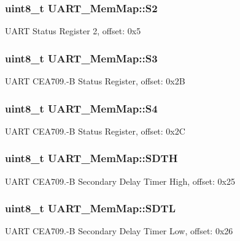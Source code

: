 \subsubsection[{S2}]{\setlength{\rightskip}{0pt plus 5cm}uint8\+\_\+t U\+A\+R\+T\+\_\+\+Mem\+Map\+::\+S2}\label{struct_u_a_r_t___mem_map_a6107c55f4dba727e1a4e70f76acd7b20}
U\+A\+R\+T Status Register 2, offset\+: 0x5 \hypertarget{struct_u_a_r_t___mem_map_a3aa12aba05d8d4c73c27c316a0f422cc}{}
\subsubsection[{S3}]{\setlength{\rightskip}{0pt plus 5cm}uint8\+\_\+t U\+A\+R\+T\+\_\+\+Mem\+Map\+::\+S3}\label{struct_u_a_r_t___mem_map_a3aa12aba05d8d4c73c27c316a0f422cc}
U\+A\+R\+T C\+E\+A709.-\/\+B Status Register, offset\+: 0x2\+B \hypertarget{struct_u_a_r_t___mem_map_a94722c3f3c663800fc6178ac9f24049b}{}
\subsubsection[{S4}]{\setlength{\rightskip}{0pt plus 5cm}uint8\+\_\+t U\+A\+R\+T\+\_\+\+Mem\+Map\+::\+S4}\label{struct_u_a_r_t___mem_map_a94722c3f3c663800fc6178ac9f24049b}
U\+A\+R\+T C\+E\+A709.-\/\+B Status Register, offset\+: 0x2\+C \hypertarget{struct_u_a_r_t___mem_map_ace3766dcf2abe24be7b96e83348bb07f}{}
\subsubsection[{S\+D\+T\+H}]{\setlength{\rightskip}{0pt plus 5cm}uint8\+\_\+t U\+A\+R\+T\+\_\+\+Mem\+Map\+::\+S\+D\+T\+H}\label{struct_u_a_r_t___mem_map_ace3766dcf2abe24be7b96e83348bb07f}
U\+A\+R\+T C\+E\+A709.-\/\+B Secondary Delay Timer High, offset\+: 0x25 \hypertarget{struct_u_a_r_t___mem_map_a3b5758c5c5e69ce53c96f4f22c68eeb4}{}
\subsubsection[{S\+D\+T\+L}]{\setlength{\rightskip}{0pt plus 5cm}uint8\+\_\+t U\+A\+R\+T\+\_\+\+Mem\+Map\+::\+S\+D\+T\+L}\label{struct_u_a_r_t___mem_map_a3b5758c5c5e69ce53c96f4f22c68eeb4}
U\+A\+R\+T C\+E\+A709.-\/\+B Secondary Delay Timer Low, offset\+: 0x26 \hypertarget{struct_u_a_r_t___mem_map_a5c2f7031c23749513028d0f35f833756}{}
